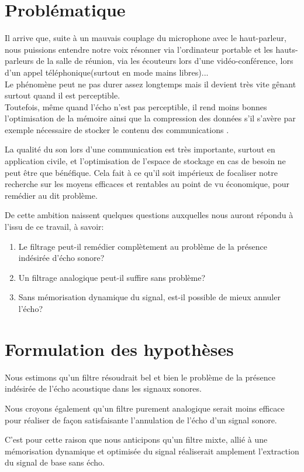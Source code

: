 \section{Problématique}
Il arrive que, suite à un mauvais couplage du microphone avec le haut-parleur, nous puissions entendre notre voix résonner via l'ordinateur portable et les hauts-parleurs de la salle de réunion, via les écouteurs lors d'une vidéo-conférence, lors d'un appel téléphonique(surtout en mode mains libres)...\\
Le phénomène peut ne pas durer assez longtemps mais il devient très vite gênant surtout quand il est perceptible.\\
Toutefois, même quand l'écho n'est pas perceptible, il rend moins bonnes l'optimisation de la mémoire ainsi que la compression des données s'il s'avère par exemple nécessaire de stocker le contenu des communications \cite{bellanger2012theorie}.

La qualité du son lors d'une communication est très importante, surtout en application civile, et l'optimisation de l'espace de stockage en cas de besoin ne peut être que bénéfique. Cela fait à ce qu'il soit impérieux de focaliser notre recherche sur les moyens efficaces et rentables au point de vu économique, pour remédier au dit problème. 

De cette ambition naissent quelques questions auxquelles nous auront répondu à l'issu de ce travail, à savoir:
\begin{enumerate}
\item Le filtrage peut-il remédier complètement au problème de la présence indésirée d'écho sonore?
\item Un filtrage analogique peut-il suffire sans problème?
\item Sans mémorisation dynamique du signal, est-il possible de mieux annuler l'écho?
\end{enumerate}
\section{Formulation des hypothèses}
Nous estimons qu'un filtre résoudrait bel et bien le problème de la présence indésirée de l'écho acoustique dans les signaux sonores.

Nous croyons également qu'un filtre purement analogique serait moins efficace pour réaliser de façon satisfaisante l'annulation de l'écho d'un signal sonore.

C'est pour cette raison que nous anticipons qu'un filtre mixte, allié à une mémorisation dynamique et optimisée du signal réaliserait amplement l'extraction du signal de base sans écho.
